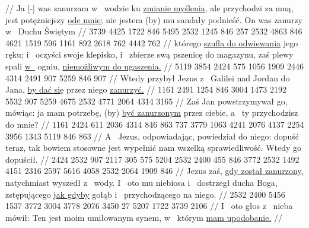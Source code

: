 //
\glb
{} Ja [-] was zanurzam w~ wodzie ku \underline{zmianie myślenia,} ale  przychodzi za mną, jest potężniejszy \underline{ode mnie;} nie jestem  (by) mu sandały podnieść. On was zanurzy w~ Duchu Świętym
//
\endgl
\begingl
\gla
{} 3739 4425 1722 846 5495 2532 1245 846 257 2532 4863 846 4621 1519 596 1161 892 2618 762 4442 762
//
\glb
{} którego \underline{szufla do odwiewania}  jego ręku; i~ oczyści swoje klepisko, i~ zbierze swą pszenicę do magazynu, zaś plewy spali \underline{w~} ogniu, \underline{niemożliwym do ugaszenia.}
//
\endgl
\begingl
\gla
{} 5119 3854 2424 575 1056 1909 2446 4314 2491 907 5259 846 907
//
\glb
{} Wtedy przybył Jezus z~ Galilei nad Jordan do Jana, \underline{by dać się} przez niego \underline{zanurzyć.}
//
\endgl
\begingl
\gla
{} 1161 2491 1254 846 3004 1473 2192 5532 {} 907 5259 4675 2532 4771 2064 4314 3165
//
\glb
{} Zaś Jan powstrzymywał go, mówiąc: ja mam potrzebę, (by) \underline{być zanurzonym} przez ciebie, a~ ty przychodzisz do mnie?
//
\endgl
\begingl
\gla
{} 1161 2424 611 2036 4314 846 863 737 3779 1063 4241 2076 4137 2254 3956 1343 5119 846 863
//
\glb
{} A~ Jezus, odpowiadając, powiedział do niego: dopuść teraz, tak bowiem stosowne jest wypełnić nam wszelką sprawiedliwość. Wtedy go dopuścił.
//
\endgl
\begingl
\gla
{} 2424 2532 907 2117 305 575 5204 2532 2400 455 846 3772 2532 1492 4151 2316 2597 5616 4058 2532 2064 1909 846
//
\glb
{} Jezus zaś, \underline{gdy został zanurzony,} natychmiast wyszedł z~ wody. I~ oto  mu niebiosa i~ dostrzegł ducha Boga, zstępującego \underline{jak gdyby} gołąb i~ przychodzącego na niego.
//
\endgl
\begingl
\gla
{} 2532 2400 5456 1537 3772 3004 3778 2076 3450 27 5207 1722 3739 2106
//
\glb
{} I~ oto głos z~ nieba mówił: Ten jest moim umiłowanym synem, w~ którym \underline{mam upodobanie.}
//
\endgl

